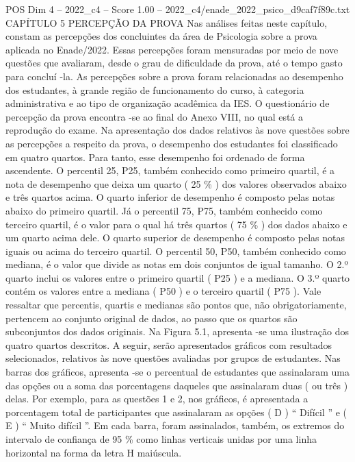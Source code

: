 \begin{textsample}{POS Dim 4 – 2022\_c4 – Score 1.00 – 2022\_c4/enade\_2022\_psico\_d9caf7f89c.txt}  \label{ex:f4_pos_149}
CAPÍTULO 5 PERCEPÇÃO DA PROVA Nas análises feitas neste capítulo, constam as percepções dos concluintes da área de Psicologia sobre a prova aplicada no Enade/2022.
Essas percepções foram mensuradas por meio de nove questões que avaliaram, desde o grau de dificuldade da prova, até o tempo gasto para concluí -la.
As percepções sobre a prova foram relacionadas ao desempenho dos estudantes, à grande região de funcionamento do curso, à categoria administrativa e ao tipo de organização acadêmica da IES.
O questionário de percepção da prova encontra -se ao final do Anexo VIII, no qual está a reprodução do exame.
Na apresentação dos dados relativos às nove questões sobre as percepções a respeito da prova, o desempenho dos estudantes foi classificado em quatro quartos.
Para tanto, esse desempenho foi ordenado de forma ascendente.
O percentil 25, P25, também conhecido como primeiro quartil, é a nota de desempenho que deixa um quarto ( 25 \% ) dos valores observados abaixo e três quartos acima.
O quarto inferior de desempenho é composto pelas notas abaixo do primeiro quartil.
Já o percentil 75, P75, também conhecido como terceiro quartil, é o valor para o qual há três quartos ( 75 \% ) dos dados abaixo e um quarto acima dele.
O quarto superior de desempenho é composto pelas notas iguais ou acima do terceiro quartil.
O percentil 50, P50, também conhecido como mediana, é o valor que divide as notas em dois conjuntos de igual tamanho.
O 2.º quarto inclui os valores entre o primeiro quartil ( P25 ) e a mediana.
O 3.º quarto contém os valores entre a mediana ( P50 ) e o terceiro quartil ( P75 ).
Vale ressaltar que percentis, quartis e medianas são pontos que, não obrigatoriamente, pertencem ao conjunto original de dados, ao passo que os quartos são subconjuntos dos dados originais.
Na Figura 5.1, apresenta -se uma ilustração dos quatro quartos descritos.
A seguir, serão apresentados gráficos com resultados selecionados, relativos às nove questões avaliadas por grupos de estudantes.
Nas barras dos gráficos, apresenta -se o percentual de estudantes que assinalaram uma das opções ou a soma das porcentagens daqueles que assinalaram duas ( ou três ) delas.
Por exemplo, para as questões 1 e 2, nos gráficos, é apresentada a porcentagem total de participantes que assinalaram as opções ( D ) “ Difícil ” e ( E ) “ Muito difícil ”.
Em cada barra, foram assinalados, também, os extremos do intervalo de confiança de 95 \% como linhas verticais unidas por uma linha horizontal na forma da letra H maiúscula.

\end{textsample}
